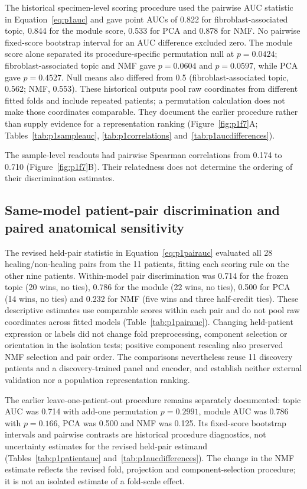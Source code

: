 \documentclass[10pt,a4paper]{article}
\begin{document}
The historical specimen-level scoring procedure used the pairwise AUC statistic in Equation~\eqref{eq:p1auc} and gave point AUCs of 0.822 for fibroblast-associated topic, 0.844 for the module score, 0.533 for PCA and 0.878 for NMF. No pairwise fixed-score bootstrap interval for an AUC difference excluded zero. The module score alone separated its procedure-specific permutation null at $p=0.0424$; fibroblast-associated topic and NMF gave $p=0.0604$ and $p=0.0597$, while PCA gave $p=0.4527$. Null means also differed from 0.5 (fibroblast-associated topic, 0.562; NMF, 0.553). These historical outputs pool raw coordinates from different fitted folds and include repeated patients; a permutation calculation does not make those coordinates comparable. They document the earlier procedure rather than supply evidence for a representation ranking (Figure~\ref{fig:p1f7}A\label{call:p1f7}; Tables~\ref{tab:p1sampleauc}, \ref{tab:p1correlations} and~\ref{tab:p1aucdifferences}).

The sample-level readouts had pairwise Spearman correlations from 0.174 to 0.710 (Figure~\ref{fig:p1f7}B). Their relatedness does not determine the ordering of their discrimination estimates.




\subsection{Same-model patient-pair discrimination and paired anatomical sensitivity}

The revised held-pair statistic in Equation~\eqref{eq:p1pairauc} evaluated all 28 healing/non-healing pairs from the 11 patients, fitting each scoring rule on the other nine patients. Within-model pair discrimination was 0.714 for the frozen topic (20 wins, no ties), 0.786 for the module (22 wins, no ties), 0.500 for PCA (14 wins, no ties) and 0.232 for NMF (five wins and three half-credit ties). These descriptive estimates use comparable scores within each pair and do not pool raw coordinates across fitted models (Table~\ref{tab:p1pairauc}). Changing held-patient expression or labels did not change fold preprocessing, component selection or orientation in the isolation tests; positive component rescaling also preserved NMF selection and pair order. The comparisons nevertheless reuse 11 discovery patients and a discovery-trained panel and encoder, and establish neither external validation nor a population representation ranking.

The earlier leave-one-patient-out procedure remains separately documented: topic AUC was 0.714 with add-one permutation $p=0.2991$, module AUC was 0.786 with $p=0.166$, PCA was 0.500 and NMF was 0.125. Its fixed-score bootstrap intervals and pairwise contrasts are historical procedure diagnostics, not uncertainty estimates for the revised held-pair estimand (Tables~\ref{tab:p1patientauc} and~\ref{tab:p1aucdifferences}). The change in the NMF estimate reflects the revised fold, projection and component-selection procedure; it is not an isolated estimate of a fold-scale effect.
\end{document}
